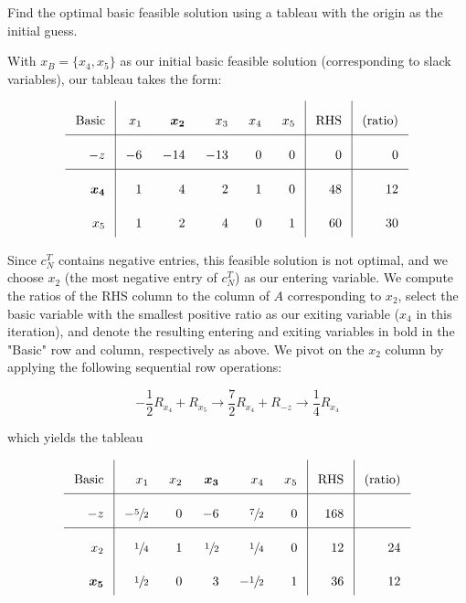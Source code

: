 Find the optimal basic feasible solution using a tableau with the origin as the initial guess.

\begin{solution}
  With $x_B = \{ x_4, x_5 \}$ as our initial basic feasible solution (corresponding to slack variables), our tableau
  takes the form:

  \[\arraycolsep=8pt\def\arraystretch{2.2}
  \begin{array}{r|rrrrr|r|r}
     \text{Basic} &  x_1  &  \bm{x_2}  &  x_3  &  x_4  & x_5 &  \text{RHS} & \text{(ratio)}  \\ \hline
    -z            &  -6   &  -14       &  -13  &   0   &  0  &   0         & 0               \\ \hline
     \bm{x_4}     &   1   &   4        &   2   &   1   &  0  &  48         & 12              \\
     x_5          &   1   &   2        &   4   &   0   &  1  &  60         & 30
  \end{array}
  \]

  Since $c_N^T$ contains negative entries, this feasible solution is not optimal, and we choose $x_2$ (the most negative
  entry of $c_N^T$) as our entering variable. We compute the ratios of the RHS column to the column of $A$ corresponding
  to $x_2$, select the basic variable with the smallest positive ratio as our exiting variable ($x_4$ in this 
  iteration), and denote the resulting entering and exiting variables in bold in the "Basic" row and column, 
  respectively as above. We pivot on the $x_2$ column by applying the following sequential row operations:

  $$
  -\frac{1}{2} R_{x_4} + R_{x_5}  \longrightarrow \frac{7}{2} R_{x_4} + R_{-z} \longrightarrow \frac{1}{4} R_{x_4}
  $$

  which yields the tableau
  
  \[\arraycolsep=8pt\def\arraystretch{2.2}
  \begin{array}{r|rrrrr|r|r}
     \text{Basic} &  x_1           &  x_2 &  \bm{x_3}      &   x_4           &   x_5 & \text{RHS}  & \text{(ratio)}  \\ \hline
     -z           & -\sfrac{5}{2}  &  0   &  -6            &   \sfrac{7}{2}  &   0   &  168        &                 \\ \hline
      x_2         &  \sfrac{1}{4}  &  1   &   \sfrac{1}{2} &   \sfrac{1}{4}  &   0   &  12         & 24              \\
     \bm{x_5}     &  \sfrac{1}{2}  &  0   &   3            &  -\sfrac{1}{2}  &   1   &  36         & 12              
  \end{array}
  \]


\end{solution}
